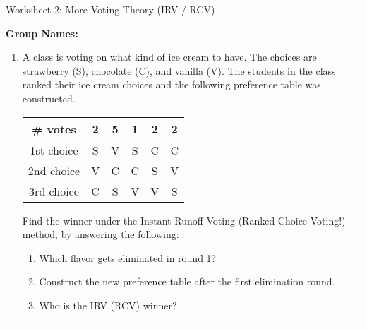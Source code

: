 \documentclass[12pt]{article}
\newcommand{\ans}[1][1in]{\rule{#1}{.5pt}}
\begin{document}
\begin{center}
{\Large  Worksheet 2:  More Voting Theory (IRV / RCV)	 	}
\end{center}



\noindent \textbf{Group Names:} \hrulefill \\
\begin{enumerate}     

\item A class is voting on what kind of ice cream to have. The choices are strawberry (S), chocolate (C), and vanilla (V). The students in the class ranked their ice cream choices and the following preference table was constructed. %




\begingroup %
\renewcommand{\arraystretch}{2} %
    \begin{tabular}{| c  | c | c  | c  | c| c |} \hline
    \# votes & 2 & 5 & 1& 2 & 2\\ \hline \hline
1st choice & S& V& S &C& C\\ \hline
2nd choice &  V &C &  C & S&V\\ \hline
3rd choice & C & S& V & V & S\\ \hline
\end{tabular}
\endgroup 



Find the winner under the Instant Runoff Voting (Ranked Choice Voting!) method, by answering the following:

\begin{enumerate}
\item Which flavor gets eliminated in round 1? \hrulefill
\vspace{1 cm}
\item Construct the new preference table after the first elimination round.
\vfill
\item Who is the IRV (RCV) winner? \ans
\vspace{1in}


\end{enumerate}
\end{enumerate}
\end{document}
